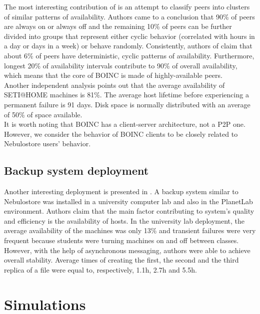\documentclass{pracamgren}
\begin{document}
The most interesting contribution of \cite{availability} is an attempt to classify peers into clusters of similar patterns of availability. Authors came to a conclusion that 90\% of peers are always on or always off and the remaining 10\% of peers can be further divided into groups that represent either cyclic behavior (correlated with hours in a day or days in a week) or behave randomly. Consistently, authors of \cite{seti} claim that about 6\% of peers have deterministic, cyclic patterns of availability. Furthermore, longest 20\% of availability intervals contribute to 90\% of overall availability, which means that the core of BOINC is made of highly-available peers.\\

Another independent analysis \cite{storage} points out that the average availability of SETI@HOME machines is 81\%. The average host lifetime before experiencing a permanent failure is 91 days. Disk space is normally distributed with an average of 50\% of space available.\\

It is worth noting that BOINC has a client-server architecture, not a P2P one. However, we consider the behavior of BOINC clients to be closely related to Nebulostore users' behavior.\\

\subsection{Backup system deployment}

Another interesting deployment is presented in \cite{hetero}. A backup system similar to Nebulostore was installed in a university computer lab and also in the PlanetLab environment. Authors claim that the main factor contributing to system's quality and efficiency is the availability of hosts. In the university lab deployment, the average availability of the machines was only 13\% and transient failures were very frequent because students were turning machines on and off between classes. However, with the help of asynchronous messaging, authors were able to achieve overall stability. Average times of creating the first, the second and the third replica of a file were equal to, respectively, 1.1h, 2.7h and 5.5h.\\

\section{Simulations}
\end{document}
